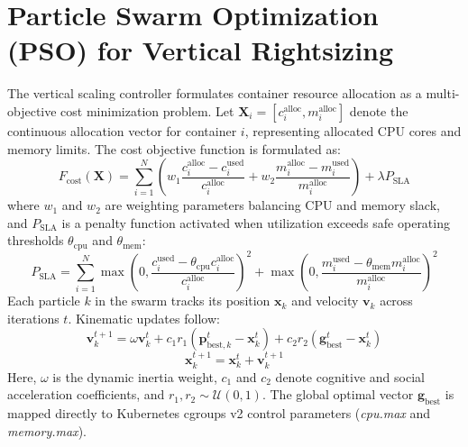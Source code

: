 \documentclass[12pt,a4paper]{report}
\begin{document}
	\section{Particle Swarm Optimization (PSO) for Vertical Rightsizing}
	The vertical scaling controller formulates container resource allocation as a multi-objective cost minimization problem. Let $\mathbf{X}_i = [c_i^{\text{alloc}}, m_i^{\text{alloc}}]$ denote the continuous allocation vector for container $i$, representing allocated CPU cores and memory limits. The cost objective function is formulated as:
	\begin{equation}
		F_{\text{cost}}(\mathbf{X}) = \sum_{i=1}^N \left( w_1 \frac{c_i^{\text{alloc}} - c_i^{\text{used}}}{c_i^{\text{alloc}}} + w_2 \frac{m_i^{\text{alloc}} - m_i^{\text{used}}}{m_i^{\text{alloc}}} \right) + \lambda P_{\text{SLA}}
	\end{equation}
	where $w_1$ and $w_2$ are weighting parameters balancing CPU and memory slack, and $P_{\text{SLA}}$ is a penalty function activated when utilization exceeds safe operating thresholds $\theta_{\text{cpu}}$ and $\theta_{\text{mem}}$:
	\begin{equation}
		P_{\text{SLA}} = \sum_{i=1}^N \max\left(0, \frac{c_i^{\text{used}} - \theta_{\text{cpu}} c_i^{\text{alloc}}}{c_i^{\text{alloc}}}\right)^2 + \max\left(0, \frac{m_i^{\text{used}} - \theta_{\text{mem}} m_i^{\text{alloc}}}{m_i^{\text{alloc}}}\right)^2
	\end{equation}
	Each particle $k$ in the swarm tracks its position $\mathbf{x}_k$ and velocity $\mathbf{v}_k$ across iterations $t$. Kinematic updates follow:
	\begin{equation}
		\mathbf{v}_k^{t+1} = \omega \mathbf{v}_k^t + c_1 r_1 (\mathbf{p}_{\text{best},k}^t - \mathbf{x}_k^t) + c_2 r_2 (\mathbf{g}_{\text{best}}^t - \mathbf{x}_k^t)
	\end{equation}
	\begin{equation}
		\mathbf{x}_k^{t+1} = \mathbf{x}_k^t + \mathbf{v}_k^{t+1}
	\end{equation}
	Here, $\omega$ is the dynamic inertia weight, $c_1$ and $c_2$ denote cognitive and social acceleration coefficients, and $r_1, r_2 \sim \mathcal{U}(0,1)$. The global optimal vector $\mathbf{g}_{\text{best}}$ is mapped directly to Kubernetes cgroups v2 control parameters (\textit{cpu.max} and \textit{memory.max}).
	
\end{document}
